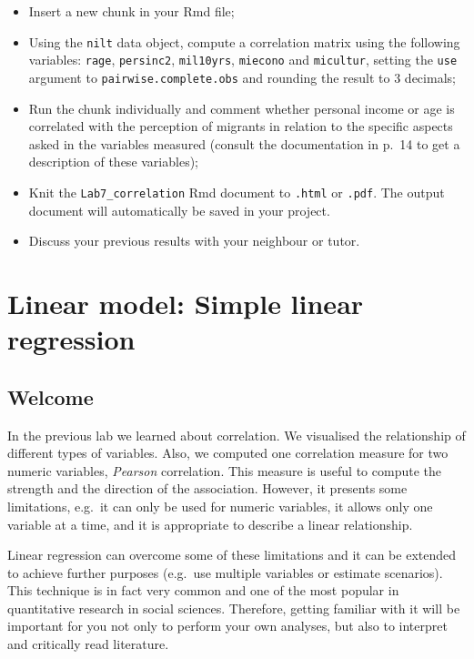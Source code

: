 \documentclass[
]{book}
\providecommand{\tightlist}{%
  \setlength{\itemsep}{0pt}\setlength{\parskip}{0pt}}
\begin{document}
\begin{itemize}
\tightlist
\item
  Insert a new chunk in your Rmd file;
\item
  Using the \texttt{nilt} data object, compute a correlation matrix using the following variables: \texttt{rage}, \texttt{persinc2}, \texttt{mil10yrs}, \texttt{miecono} and \texttt{micultur}, setting the \texttt{use} argument to \texttt{\textquotesingle{}pairwise.complete.obs\textquotesingle{}} and rounding the result to 3 decimals;
\item
  Run the chunk individually and comment whether personal income or age is correlated with the perception of migrants in relation to the specific aspects asked in the variables measured (consult the documentation in p.~14 to get a description of these variables);
\item
  Knit the \texttt{Lab7\_correlation} Rmd document to \texttt{.html} or \texttt{.pdf}. The output document will automatically be saved in your project.
\item
  Discuss your previous results with your neighbour or tutor.
\end{itemize}

\hypertarget{simple-lm}{%
\chapter{Linear model: Simple linear regression}\label{simple-lm}}

\hypertarget{welcome}{%
\section{Welcome}\label{welcome}}

In the previous lab we learned about correlation. We visualised the relationship of different types of variables. Also, we computed one correlation measure for two numeric variables, \emph{Pearson} correlation. This measure is useful to compute the strength and the direction of the association. However, it presents some limitations, e.g.~it can only be used for numeric variables, it allows only one variable at a time, and it is appropriate to describe a linear relationship.

Linear regression can overcome some of these limitations and it can be extended to achieve further purposes (e.g.~use multiple variables or estimate scenarios). This technique is in fact very common and one of the most popular in quantitative research in social sciences. Therefore, getting familiar with it will be important for you not only to perform your own analyses, but also to interpret and critically read literature.
\end{document}
